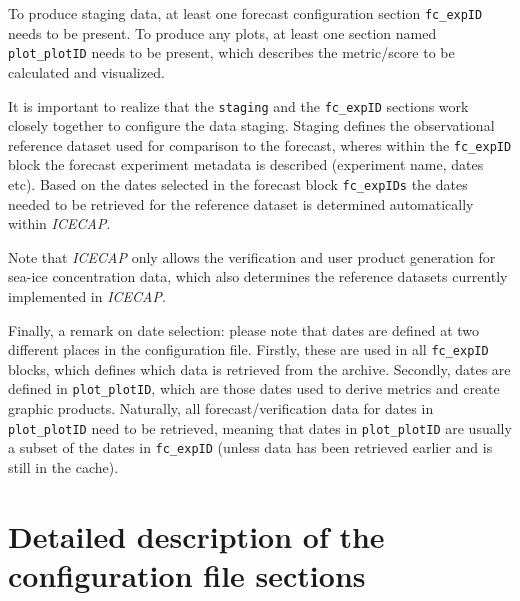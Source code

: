 \documentclass[DIV=10, parskip=full]{scrreprt}
\newcommand{\ice}{\textit{ICECAP}\xspace}
\begin{document}
To produce staging data, at least one forecast configuration section \texttt{fc\_expID} needs to be present. To produce any plots, at least one section named \texttt{plot\_plotID} needs to be present, which describes the metric/score to be calculated and visualized. 

It is important to realize that the \texttt{staging} and the \texttt{fc\_expID} sections work closely together to configure the data staging. Staging defines the observational reference dataset used for comparison to the forecast, wheres within the \texttt{fc\_expID} block the forecast experiment metadata is described (experiment name, dates etc). Based on the dates selected in the forecast block \texttt{fc\_expIDs} the dates needed to be retrieved for the reference dataset is determined automatically within \ice.

Note that \ice only allows the verification and user product generation for sea-ice concentration data, which also determines the reference datasets currently implemented in \ice. 


Finally, a remark on date selection: please note that dates are defined at two different places in the configuration file. Firstly, these are used in all \texttt{fc\_expID} blocks, which defines which data is retrieved from the archive. Secondly, dates are defined in \texttt{plot\_plotID}, which are those dates used to derive metrics and create graphic products. Naturally, all forecast/verification data for dates in \texttt{plot\_plotID} need to be retrieved, meaning that dates in \texttt{plot\_plotID} are usually a subset of the dates in \texttt{fc\_expID} (unless data has been retrieved earlier and is still in the cache).

\section{Detailed description of the configuration file sections}
\end{document}

